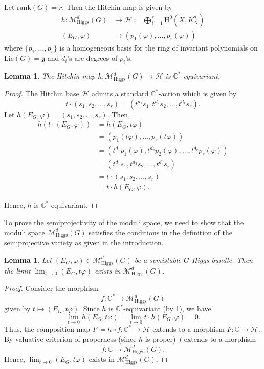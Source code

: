 \documentclass[11pt, reqno]{amsart}
\numberwithin{equation}{section}
\newtheorem{lemma}[theorem]{Lemma}
\theoremstyle{definition}
\begin{document}
Let $\mathrm{rank}(G)=r$. Then the Hitchin map is given by
\begin{align*}
    h : \mathcal{M}^d_{\mathrm{Higgs}}(G) &\longrightarrow \mathcal{H} \coloneqq \bigoplus_{i=1}^{r}\mathrm{H}^0(X, K_X^{d_i})\\
    (E_G,\varphi) &\mapsto (p_1(\varphi),\dots, p_r(\varphi))
\end{align*}
where $\{p_1,\dots,p_r\}$ is a homogeneous basis for the ring of invariant polynomials on $\mathrm{Lie}(G)=\mathfrak{g}$ and $d_i$'s are degrees of $p_i$'s.
\begin{lemma}\label{equivariant}
The Hitchin map $h : \mathcal{M}^d_{\mathrm{Higgs}}(G) \to \mathcal{H}$ is $\mathbb{C}^*$-equivariant.
\end{lemma}
\begin{proof}
The Hitchin base $\mathcal{H}$ admits a standard $\mathbb{C}^*$-action which is given by
\[
t\cdot (s_1,s_2,\dots , s_r) = (t^{d_1}s_1,t^{d_2}s_2,\dots , t^{d_r}s_r).
 \]
Let $h(E_G,\varphi) = (s_1,s_2,\dots , s_r)$. Then, 
\begin{align*}
    h(t\cdot (E_G,\varphi)) &=h(E_G,t\varphi)\\
    &=(p_1(t\varphi),\dots, p_r(t\varphi))\\
    &=(t^{d_1}p_1(\varphi),t^{d_2}p_2(\varphi),\dots , t^{d_r}p_r(\varphi))\\
    &=(t^{d_1}s_1,t^{d_2}s_2,\dots , t^{d_r}s_r)\\
    &= t\cdot (s_1,s_2,\dots , s_r)\\
    &= t\cdot h(E_G,\varphi).
\end{align*}


Hence, $h$ is $\mathbb{C}^*$-equivariant.
\end{proof}

To prove the semiprojectivity of the moduli space, we need to show that the moduli space $\mathcal{M}^d_{\mathrm{Higgs}}(G)$ satisfies the conditions in the definition of the semiprojective variety as given in the introduction.
\begin{lemma}\label{limit}
Let $(E_G,\varphi) \in \mathcal{M}^d_{\mathrm{Higgs}}(G)$ be a semistable $G$-Higgs bundle. Then the limit $\lim_{t\to 0} (E_G,t\varphi)$ exists in $\mathcal{M}^d_{\mathrm{Higgs}}(G)$.
\end{lemma}
\begin{proof}
Consider the morphism
\[
f: \mathbb{C}^* \longrightarrow \mathcal{M}^d_{\mathrm{Higgs}}(G)
\]
given by $t \mapsto (E_G,t\varphi)$. Since $h$ is $\mathbb{C}^*$-equivariant (by \ref{equivariant}), we have
\[
\lim_{t\to 0} h(E_G,t\varphi) = \lim_{t \to 0} t \cdot h(E_G,\varphi) = 0.
\]
Thus, the composition map $F \coloneqq h \circ f : \mathbb{C}^* \longrightarrow \mathcal{H}$ extends to a morphism $\hat{F} : \mathbb{C} \longrightarrow \mathcal{H}$. By valuative criterion of properness (since $h$ is proper) $f$ extends to a morphism \[
\hat{f}: \mathbb{C} \longrightarrow \mathcal{M}^d_{\mathrm{Higgs}}(G).
\]
Hence, $\lim_{t\to 0} (E_G,t\varphi)$ exists in $\mathcal{M}^d_{\mathrm{Higgs}}(G)$.
\end{proof}
\end{document}
